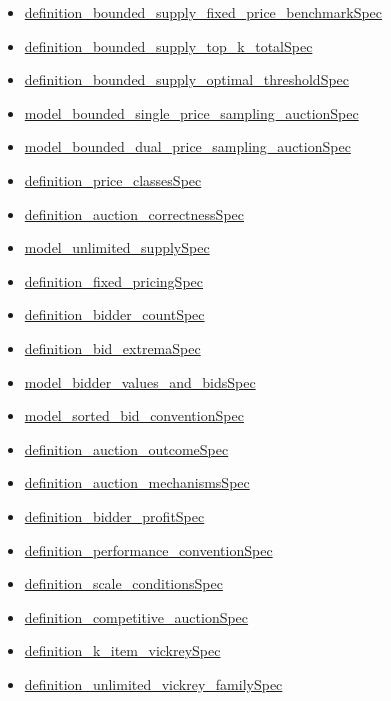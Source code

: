 \documentclass[10pt]{article}
\begin{document}
\begin{itemize}[leftmargin=1.2em]
\begin{itemize}[leftmargin=1.2em]
\item \hyperlink{source-claim-5c6c825e7e742c65}{definition\_bounded\_supply\_fixed\_price\_benchmarkSpec}
\item \hyperlink{source-claim-804fa85d702dba6f}{definition\_bounded\_supply\_top\_k\_totalSpec}
\item \hyperlink{source-claim-ffcc097a398a48e7}{definition\_bounded\_supply\_optimal\_thresholdSpec}
\item \hyperlink{source-claim-ec9d72942c947690}{model\_bounded\_single\_price\_sampling\_auctionSpec}
\item \hyperlink{source-claim-cea76b79a41765be}{model\_bounded\_dual\_price\_sampling\_auctionSpec}
\item \hyperlink{source-claim-4e4374900527b0f0}{definition\_price\_classesSpec}
\item \hyperlink{source-claim-f5aa4c6369b51530}{definition\_auction\_correctnessSpec}
\item \hyperlink{source-claim-ce5033b86185a6e5}{model\_unlimited\_supplySpec}
\item \hyperlink{source-claim-c87f535bc9ad76c0}{definition\_fixed\_pricingSpec}
\item \hyperlink{source-claim-71dcfd816163acb2}{definition\_bidder\_countSpec}
\item \hyperlink{source-claim-df5235958b6d7ea9}{definition\_bid\_extremaSpec}
\item \hyperlink{source-claim-48593168ec07b0d9}{model\_bidder\_values\_and\_bidsSpec}
\item \hyperlink{source-claim-3bc5d96e39ab913a}{model\_sorted\_bid\_conventionSpec}
\item \hyperlink{source-claim-6a520bdced8a8b28}{definition\_auction\_outcomeSpec}
\item \hyperlink{source-claim-3182def2fd3126fc}{definition\_auction\_mechanismsSpec}
\item \hyperlink{source-claim-437a3f337df1e177}{definition\_bidder\_profitSpec}
\item \hyperlink{source-claim-3077d698b4080f2c}{definition\_performance\_conventionSpec}
\item \hyperlink{source-claim-063516640731ad8f}{definition\_scale\_conditionsSpec}
\item \hyperlink{source-claim-4ea45a9e13ad5c07}{definition\_competitive\_auctionSpec}
\item \hyperlink{source-claim-c2c1b6c0e860a69c}{definition\_k\_item\_vickreySpec}
\item \hyperlink{source-claim-60e5eee461d50443}{definition\_unlimited\_vickrey\_familySpec}

\end{itemize}
\end{itemize}
\end{document}
